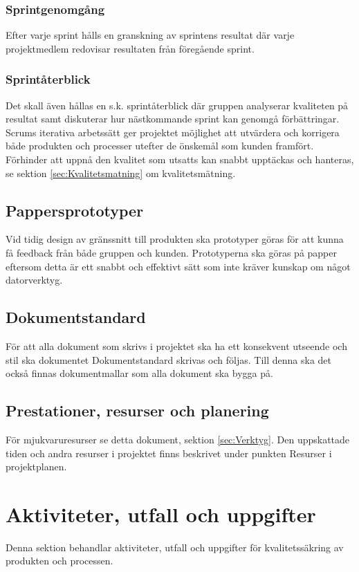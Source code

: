 \documentclass[a4paper,10pt]{article}
\begin{document}
\subsubsection{Sprintgenomgång}
Efter varje sprint hålls en granskning av sprintens resultat där varje projektmedlem redovisar resultaten från föregående sprint.

\subsubsection{Sprintåterblick}
Det skall även hållas en s.k. sprintåterblick där gruppen analyserar kvaliteten på resultat samt diskuterar hur nästkommande sprint kan genomgå förbättringar.
Scrums iterativa arbetssätt ger projektet möjlighet att utvärdera och korrigera både produkten och processer utefter de önskemål som kunden framfört. Förhinder att uppnå den kvalitet som utsatts kan snabbt upptäckas och hanteras, se sektion \ref{sec:Kvalitetsmatning} om kvalitetsmätning.

\subsection{Pappersprototyper}
Vid tidig design av gränssnitt till produkten ska prototyper göras för att kunna få feedback från både gruppen och kunden. Prototyperna ska göras på papper eftersom detta är ett snabbt och effektivt sätt som inte kräver kunskap om något datorverktyg.

\subsection{Dokumentstandard}
För att alla dokument som skrivs i projektet ska ha ett konsekvent utseende och stil ska dokumentet Dokumentstandard skrivas och följas. Till denna ska det också finnas dokumentmallar som alla dokument ska bygga på.

\subsection{Prestationer, resurser och planering}
För mjukvaruresurser se detta dokument, sektion \ref{sec:Verktyg}.
Den uppskattade tiden och andra resurser i projektet finns beskrivet under punkten Resurser i projektplanen.

\section{Aktiviteter, utfall och uppgifter}
Denna sektion behandlar aktiviteter, utfall och uppgifter för kvalitetssäkring av produkten och processen.
\end{document}

